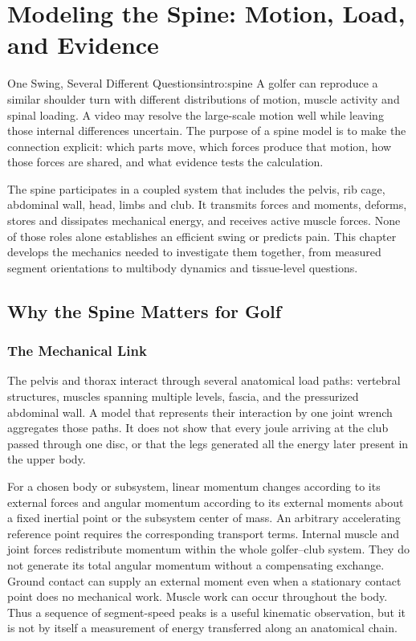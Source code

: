 \chapter{Modeling the Spine: Motion, Load, and Evidence}
\label{ch:spine_modeling}

\begin{laymansbox}{One Swing, Several Different Questions}{intro:spine}
A golfer can reproduce a similar shoulder turn with different distributions of motion, muscle activity and spinal loading. A video may resolve the large-scale motion well while leaving those internal differences uncertain. The purpose of a spine model is to make the connection explicit: which parts move, which forces produce that motion, how those forces are shared, and what evidence tests the calculation.

The spine participates in a coupled system that includes the pelvis, rib cage, abdominal wall, head, limbs and club. It transmits forces and moments, deforms, stores and dissipates mechanical energy, and receives active muscle forces. None of those roles alone establishes an efficient swing or predicts pain. This chapter develops the mechanics needed to investigate them together, from measured segment orientations to multibody dynamics and tissue-level questions.
\end{laymansbox}

\section{Why the Spine Matters for Golf}
\label{sec:spine_importance}

\subsection{The Mechanical Link}
The pelvis and thorax interact through several anatomical load paths: vertebral structures, muscles spanning multiple levels, fascia, and the pressurized abdominal wall. A model that represents their interaction by one joint wrench aggregates those paths. It does not show that every joule arriving at the club passed through one disc, or that the legs generated all the energy later present in the upper body.

For a chosen body or subsystem, linear momentum changes according to its external forces and angular momentum according to its external moments about a fixed inertial point or the subsystem center of mass. An arbitrary accelerating reference point requires the corresponding transport terms. Internal muscle and joint forces redistribute momentum within the whole golfer--club system. They do not generate its total angular momentum without a compensating exchange. Ground contact can supply an external moment even when a stationary contact point does no mechanical work. Muscle work can occur throughout the body. Thus a sequence of segment-speed peaks is a useful kinematic observation, but it is not by itself a measurement of energy transferred along an anatomical chain.

